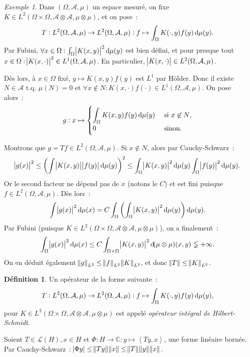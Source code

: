\documentclass{report}
\newcommand{\C}{{\mathbb C}}
\newcommand{\scpr}[2]{\left\langle#1, #2\right\rangle}
\newcommand{\tq}{\text{ t.q. }}
\newcommand{\st}{\tq}
\newcommand{\pinfty}{{+\infty}}
\theoremstyle{definition}
\newtheorem{déf}[thm]{Définition}
\theoremstyle{remark}
\newtheorem{ex}{Exemple}[chapter]
\begin{document}
\begin{ex}
Dans $(\Omega, \mathcal A, \mu)$ un espace mesuré, on fixe $K \in L^2(\Omega \times \Omega, \mathcal A \otimes \mathcal A, \mu \otimes \mu)$, et on pose~:
\[T : L^2(\Omega, \mathcal A, \mu) \to L^2(\Omega, \mathcal A, \mu) : f \mapsto \int_\Omega K(\cdot, y)f(y)\dif\mu(y).\]
Par Fubini, $\forall x \in \Omega : \int_\Omega \abs {K(x, y)}^2\dif\mu(y)$ est bien défini, et pour presque tout $x \in \Omega :
\abs {K(x, \cdot)}^2 \in L^1(\Omega, \mathcal A, \mu)$. En particulier, $\abs {K(x, \cdot)} \in L^2(\Omega, \mathcal A, \mu)$.

Dès lors, à $x \in \Omega$ fixé, $y \mapsto K(x, y)f(y)$ est $L^1$ par Hölder. Donc il existe $N \in \mathcal A \st \mu(N) = 0$ et $\forall x \not \in N :
K(x, \cdot)f(\cdot) \in L^1(\Omega, \mathcal A, \mu)$. On pose alors~:
\[g : x \mapsto \begin{cases}\displaystyle \int_\Omega K(x, y)f(y)\dif\mu(y) &\text{ si $x \not \in N$,} \\0 &\text{ sinon.}\end{cases}\]

Montrons que $g = Tf \in L^2(\Omega, \mathcal A, \mu)$. Si $x \not \in N$, alors par Cauchy-Schwarz~:
\[\abs {g(x)}^2 \leq \left(\int\abs {K(x, y)}\abs {f(y)}\dif\mu(y)\right)^2 \leq \int_\Omega \abs {K(x, y)}^2\dif\mu(y)\int_\Omega \abs {f(y)}^2\dif\mu(y).\]
Or le second facteur ne dépend pas de $x$ (notons le $C$) et est fini puisque $f \in L^2(\Omega, \mathcal A, \mu)$. Dès lors~:
\[\int\abs {g(x)}^2\dif\mu(x) = C\int_\Omega\left(\int_\Omega \abs {K(x, y)}^2\dif\mu(y)\right)\dif\mu(y).\]
	Par Fubini (puisque $K \in L^2(\Omega \times \Omega, \mathcal A \otimes \mathcal A, \mu \otimes \mu)$), on a finalement~:
\[\int_\Omega\abs {g(x)}^2\dif\mu(x) \leq C\int_{\Omega \times \Omega}\abs {K(x, y)}^2\dif(\mu \otimes \mu)(x, y) \lneqq \pinfty.\]
On en déduit également $\norm g_{L^2} \leq \norm f_{L^2}\norm K_{L^2}$, et donc $\norm T \leq \norm K_{L^2}$.
\end{ex}

\begin{déf} Un opérateur de la forme suivante~:
\[T : L^2(\Omega, \mathcal A, \mu) \to L^2(\Omega, \mathcal A, \mu) : f \mapsto \int_\Omega K(\cdot, y)f(y)\dif\mu(y),\]
pour $K \in L^2(\Omega \times \Omega, \mathcal A \otimes \mathcal A, \mu \otimes \mu)$ est appelé \textit{opérateur intégral de Hilbert-Schmidt}.
\end{déf}

Soient $T \in \mathcal L(H), x \in H$ et $\Phi : H \to \C : y \mapsto \scpr {Ty}x$, une forme linéaire bornée. Par Cauchy-Schwarz~:
$\abs {\Phi y} \leq \norm {Ty}\norm x \leq \norm T\norm y\norm x$.
\end{document}
